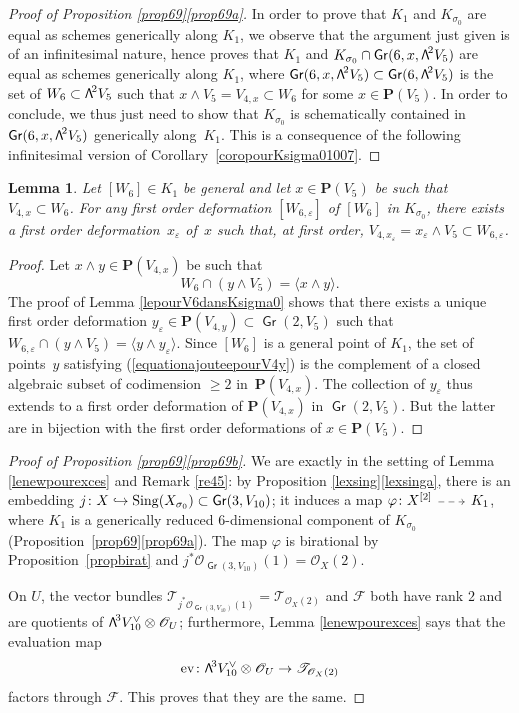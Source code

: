 \documentclass[11pt]{article}
\makeatletter
\let\mathcal\mathscr
\newcommand\hto{\mathrel{\lhook\joinrel\to}}
\newcommand{\dradpl}{{\!\!\xymatrix@C=8mm{\ar@{-->}[r]&}\!\!}}
\newcommand{\dratst}{{\,\mathrel{\scalebox{.8}{$\dradpl$}}\,}}
\newcommand{\drascst}{{\,\mathrel{\scalebox{.6}{$\dradpl$}}\,}}
\newcommand{\dra}{\mathchoice{\dradpl}{\dratst}{\drascst}{\drascst}}
\newtheorem{lemm}{Lemma}[section]
\theoremstyle{definition}
\renewcommand\P{{\mathbf P}}\let\PP\P
\newcommand\cF{\mathcal{F}}
\newcommand\cO{\mathcal{O}}\let\OO\cO
\newcommand\cT{\mathcal{T}}
\DeclareMathOperator{\Gr}{\mathsf{Gr}}
\let\eps\varepsilon
\let\phi\varphi
\let\ra\rangle
\DeclareMathOperator{\ev}{ev}
\DeclareMathOperator{\Sing}{Sing}\let\sing\Sing
\newcommand\bw[1]{{\hbox{\large$\mathsf{\Lambda}$}^{\!#1}}}
\renewcommand{\dratst}{\mathrel{\scalebox{.8}{$\dradpl$}}}
\renewcommand{\drascst}{\mathrel{\scalebox{.6}{$\dradpl$}}}
\makeatother
\begin{document}
\begin{proof}[Proof of Proposition \ref{prop69}\eqref{prop69a}]
In order to prove that $K_1$ and $K_{\sigma_0}$ are equal as schemes generically along $K_1$, we observe that the argument just given is of an
infinitesimal nature, hence proves that $K_1$ and
$K_{\sigma_0}\cap \Gr(6,x,\bw2V_5)$ are equal as schemes generically along $K_1$, where $\Gr(6,x,\bw2V_5)\subset \Gr(6,\bw2V_5)$ is the set of $W_6\subset \bw2V_5$ such that
$x\wedge V_5=V_{4,x}\subset W_6$ for some $x\in \P(V_5)$.
In order to conclude, we thus just need to show that $K_{\sigma_0}$ is schematically contained in $\Gr(6,x,\bw2V_5)$ generically along~$K_1$. This is a consequence of the following infinitesimal version of Corollary~\ref{coropourKsigma01007}.\end{proof}

\begin{lemm} Let $[W_6]\!\in\!K_1$ be general and let $x\!\in\!\P(V_5)$ be such that
$V_{4,x}\!\subset\!W_6$. For any first order deformation $[W_{6,\eps}]$ of $[W_6]$ in $K_{\sigma_0}$, there exists a first order deforma\-tion~$x_\eps$ of~$x$ such that,
at first order, $V_{4,x_\eps}=x_\eps \wedge V_5\subset W_{6,\eps}$.
\end{lemm}

\begin{proof} Let $x\wedge y\in \P(V_{4,x})$ be such that \begin{equation}\label{equationajouteepourV4y}
W_6\cap (y\wedge V_5)=\langle x\wedge y\rangle.
\end{equation}
The proof
of Lemma \ref{lepourV6dansKsigma0} shows that
there exists a unique first order deformation $ y_\eps \in \P(V_{4,y})\subset \Gr(2,V_5)$ such that
$W_{6,\eps}\cap( y\wedge V_5)=\langle y\wedge y_\eps\ra$. Since $[W_6]$ is a general point of $K_1$, the set of points~$y$ satisfying (\ref{equationajouteepourV4y}) is the complement
of a closed algebraic subset of codimension $\geq2$ in~$\P(V_{4,x})$. The collection
of $y_\eps$ thus extends to a first order deformation of $\P(V_{4,x})$ in $\Gr(2,V_5)$.
But the latter are in bijection with the first order deformations of $x\in \P(V_5)$.
\end{proof}

\begin{proof}[Proof of Proposition \ref{prop69}\eqref{prop69b}]

We are exactly in the setting of Lemma \ref{lenewpourexces} and Remark \ref{re45}: by Proposition \ref{lexsing}\eqref{lexsinga}, there is an embedding
$j\colon X\hto \Sing (X_{\sigma_0})\subset \Gr(3,V_{10})$;
it induces a map
$\phi\colon X^{[2]}\dra K_1$,
where $K_1$ is a generically reduced $6$-dimensional component of $K_{\sigma_0}$ (Proposition~\ref{prop69}\eqref{prop69a}). The map $\phi$ is birational by Proposition~\ref{propbirat} and $j^*\cO_{\Gr(3,V_{10})}(1)=\cO_X(2)$.

On $U$, the vector bundles
$\cT_{j^*\cO_{\Gr(3,V_{10})}(1)}=\cT_{\cO_X(2)}$ and $\cF$ both have rank $2$ and are quotients of $\bw3V_{10}^\vee\otimes \cO_U$; furthermore,
Lemma \ref{lenewpourexces} says that the
evaluation map
\[
\ev\colon\bw3V_{10}^\vee\otimes \cO_U\to \cT_{\cO_X(2)}
\]
factors through $\cF$. This proves that they are the same.
\end{proof}
\end{document}
